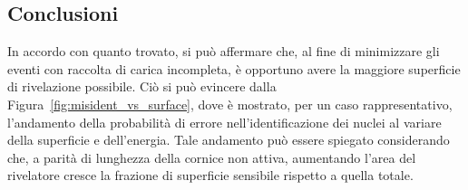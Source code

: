 \subsection*{Conclusioni}


In accordo con quanto trovato, si può affermare che, al fine di minimizzare gli eventi con raccolta di carica incompleta, è opportuno avere la maggiore superficie di rivelazione possibile.
Ciò si può evincere dalla Figura~\ref{fig:misident_vs_surface}, dove è mostrato, per un caso rappresentativo, l'andamento della probabilità di errore nell'identificazione dei nuclei al variare della superficie e dell'energia.
Tale andamento può essere spiegato considerando che, a parità di lunghezza della cornice non attiva, aumentando l'area del rivelatore cresce la frazione di superficie sensibile rispetto a quella totale.



